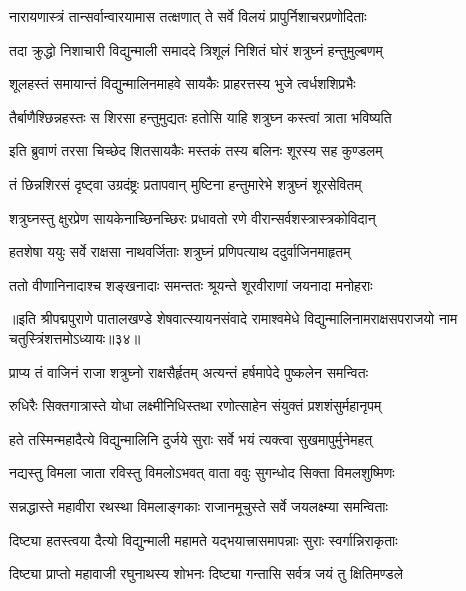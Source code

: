 \twolineshloka
{नारायणास्त्रं तान्सर्वान्वारयामास तत्क्षणात्}
{ते सर्वे विलयं प्रापुर्निशाचरप्रणोदिताः}%

\twolineshloka
{तदा क्रुद्धो निशाचारी विद्युन्माली समाददे}
{त्रिशूलं निशितं घोरं शत्रुघ्नं हन्तुमुल्बणम्}%

\twolineshloka
{शूलहस्तं समायान्तं विद्युन्मालिनमाहवे}
{सायकैः प्राहरत्तस्य भुजे त्वर्धशशिप्रभैः}%

\twolineshloka
{तैर्बाणैश्छिन्नहस्तः स शिरसा हन्तुमुद्यतः}
{हतोसि याहि शत्रुघ्न कस्त्वां त्राता भविष्यति}%

\twolineshloka
{इति ब्रुवाणं तरसा चिच्छेद शितसायकैः}
{मस्तकं तस्य बलिनः शूरस्य सह कुण्डलम्}%

\twolineshloka
{तं छिन्नशिरसं दृष्ट्वा उग्रदंष्ट्रः प्रतापवान्}
{मुष्टिना हन्तुमारेभे शत्रुघ्नं शूरसेवितम्}%

\twolineshloka
{शत्रुघ्नस्तु क्षुरप्रेण सायकेनाच्छिनच्छिरः}
{प्रधावतो रणे वीरान्सर्वशस्त्रास्त्रकोविदान्}%

\twolineshloka
{हतशेषा ययुः सर्वे राक्षसा नाथवर्जिताः}
{शत्रुघ्नं प्रणिपत्याथ ददुर्वाजिनमाहृतम्}%

\twolineshloka
{ततो वीणानिनादाश्च शङ्खनादाः समन्ततः}
{श्रूयन्ते शूरवीराणां जयनादा मनोहराः}%

{॥इति श्रीपद्मपुराणे पातालखण्डे शेषवात्स्यायनसंवादे रामाश्वमेधे विद्युन्मालिनामराक्षसपराजयो नाम चतुस्त्रिंशत्तमोऽध्यायः॥३४॥}



\twolineshloka
{प्राप्य तं वाजिनं राजा शत्रुघ्नो राक्षसैर्हृतम्}
{अत्यन्तं हर्षमापेदे पुष्कलेन समन्वितः}%

\twolineshloka
{रुधिरैः सिक्तगात्रास्ते योधा लक्ष्मीनिधिस्तथा}
{रणोत्साहेन संयुक्तं प्रशशंसुर्महानृपम्}%

\twolineshloka
{हते तस्मिन्महादैत्ये विद्युन्मालिनि दुर्जये}
{सुराः सर्वे भयं त्यक्त्वा सुखमापुर्मुनेमहत्}%

\twolineshloka
{नद्यस्तु विमला जाता रविस्तु विमलोऽभवत्}
{वाता ववुः सुगन्धोद सिक्ता विमलशुष्मिणः}%

\twolineshloka
{सन्नद्धास्ते महावीरा रथस्था विमलाङ्गकाः}
{राजानमूचुस्ते सर्वे जयलक्ष्म्या समन्विताः}%


\twolineshloka
{दिष्ट्या हतस्त्वया दैत्यो विद्युन्माली महामते}
{यद्भयात्त्रासमापन्नाः सुराः स्वर्गान्निराकृताः}%

\twolineshloka
{दिष्ट्या प्राप्तो महावाजी रघुनाथस्य शोभनः}
{दिष्ट्या गन्तासि सर्वत्र जयं तु क्षितिमण्डले}%

